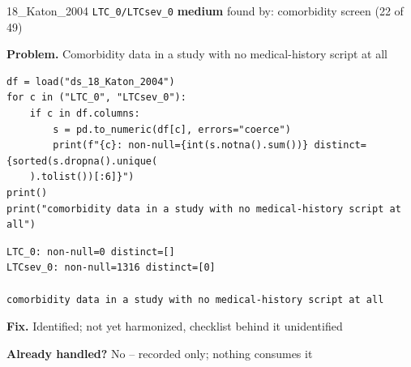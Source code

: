 \documentclass[9pt, t, handout]{beamer}
\newcommand{\ans}[1]{\textcolor{structure.fg}{#1}}
\begin{document}
\begin{frame}[fragile]{18\_Katon\_2004 \quad \texttt{LTC\_0/LTCsev\_0}}
  {\scriptsize\textcolor{blue!55!black}{\textbf{medium}} \quad
   found by: comorbidity screen \quad (22 of 49)}
  \vspace{3pt}

  {\footnotesize \textbf{Problem.} Comorbidity data in a study with no medical-history script at all}
  \vspace{4pt}

  \begin{Verbatim}[fontsize=\tiny, frame=single, framesep=2pt, label=\tiny reproduce]
df = load("ds_18_Katon_2004")
for c in ("LTC_0", "LTCsev_0"):
    if c in df.columns:
        s = pd.to_numeric(df[c], errors="coerce")
        print(f"{c}: non-null={int(s.notna().sum())} distinct={sorted(s.dropna().unique(
    ).tolist())[:6]}")
print()
print("comorbidity data in a study with no medical-history script at all")
  \end{Verbatim}
  \begin{Verbatim}[fontsize=\tiny, frame=single, framesep=2pt, label=\tiny output]
LTC_0: non-null=0 distinct=[]
LTCsev_0: non-null=1316 distinct=[0]

comorbidity data in a study with no medical-history script at all
  \end{Verbatim}
  \vspace{2pt}

  {\footnotesize \textbf{Fix.} Identified; not yet harmonized, checklist behind it unidentified}
  \vspace{2pt}

  {\footnotesize \textbf{Already handled?} \ans{No} -- recorded only; nothing consumes it
   }
\end{frame}
\end{document}
